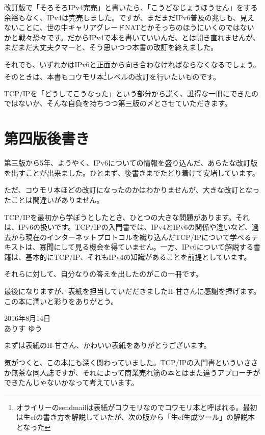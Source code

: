 改訂版で「そろそろIPv4完売」と書いたら、「こうどなじょうほうせん」をする余裕もなく、IPv4は完売しました。ですが、まだまだIPv6普及の兆しも、見えないことに、世の中キャリアグレードNATとかそっちのほうにいくのではないかと戦々恐々です。だからIPv4で本を書いていいんだ、とは開き直れませんが、まだまだ大丈夫クマーと、そう思いつつ本書の改訂を終えました。

それでも、いずれかはIPv6と正面から向き合わなければならなくなるでしょう。そのときは、本書もコウモリ本\footnote{オライリーのsendmailは表紙がコウモリなのでコウモリ本と呼ばれる。最初は生cfの書き方を解説していたが、次の版から「生cf生成ツール」の解説本となった}レベルの改訂を行いたいものです。

TCP/IPを「どうしてこうなった」という部分から説く、誰得な一冊にできたのではないか、そんな自負を持ちつつ第三版の〆とさせていただきます。



\section*{第四版後書き}
第三版から5年、ようやく、IPv6についての情報を盛り込んだ、あらたな改訂版を出すことが出来ました。ひとまず、後書きまでたどり着けて安堵しています。

ただ、コウモリ本ほどの改訂になったのかはわかりませんが、大きな改訂となったことは間違いがありません。

TCP/IPを最初から学ぼうとしたとき、ひとつの大きな問題があります。それは、IPv6の扱いです。TCP/IPの入門書では、IPv4とIPv6の関係や違いなど、過去から現在のインターネットプロトコルを織り込んだTCP/IPについて学べるテキストは、寡聞にして見る機会を得ていません。一方、IPv6について解説する書籍は、基本的にTCP/IP、それもIPv4の知識があることを前提としています。

それらに対して、自分なりの答えを出したのがこの一冊です。

最後になりますが、表紙を担当していだだきましたH-甘さんに感謝を捧げます。この本に潤いと彩りをありがとう。

\begin{flushright}
2016年8月14日 \\
ありす ゆう
\end{flushright}

まずは表紙のH-甘さん、かわいい表紙をありがとうございます。

気がつくと、この本にも深く関わっていました。TCP/IPの入門書といういささか無茶な同人誌ですが、それによって商業売れ筋の本とはまた違うアプローチができたんじゃないかなって考えています。

